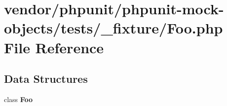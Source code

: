 \section{vendor/phpunit/phpunit-\/mock-\/objects/tests/\+\_\+fixture/\+Foo.php File Reference}
\label{_foo_8php}
\subsection*{Data Structures}
\begin{DoxyCompactItemize}
\item 
class {\bf Foo}
\end{DoxyCompactItemize}
